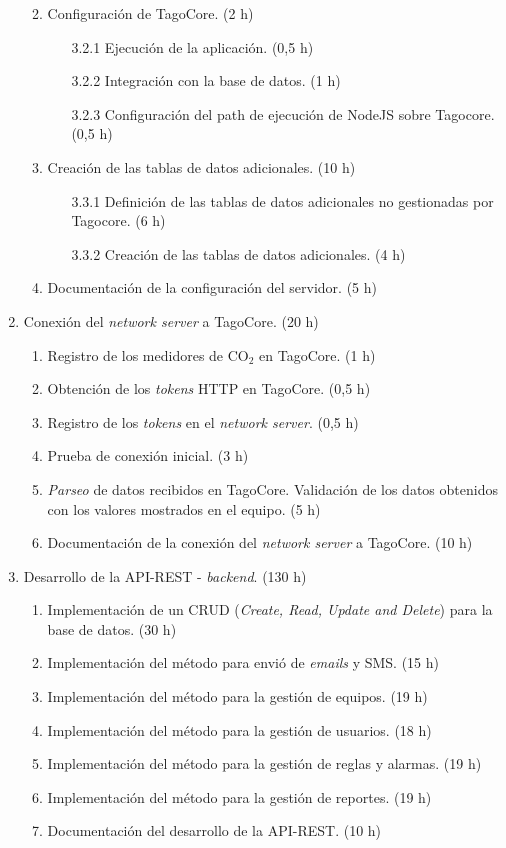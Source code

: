 \documentclass[
11pt, %
]{charter}
\begin{document}
\begin{enumerate}
\begin{enumerate}
\begin{enumerate}
		\end{enumerate}
	\item  Configuración de TagoCore. (2 h)
		\begin{enumerate}
		\item[3.2.1]Ejecución de la aplicación. 	(0,5 h)
		\item[3.2.2]Integración con la base de datos. (1 h)
		\item[3.2.3]Configuración del path de ejecución de NodeJS sobre Tagocore. (0,5 h)
		\end{enumerate}
	\item Creación de las tablas de datos adicionales. (10 h)
		\begin{enumerate}
		\item[3.3.1]Definición de las tablas de datos adicionales no gestionadas por Tagocore. 	(6 h)
		\item[3.3.2]Creación de las tablas de datos adicionales. (4 h)
		\end{enumerate}
	\item Documentación de la configuración del servidor. (5 h)
	\end{enumerate}
\item Conexión del \textit{network server} a TagoCore. (20 h)
	\begin{enumerate}
	\item Registro de los medidores de CO$_{2}$ en TagoCore. (1 h)
	\item Obtención de los \textit{tokens} HTTP en TagoCore. (0,5 h)
	\item Registro de los \textit{tokens} en el \textit{network server}. (0,5 h)
	\item Prueba de conexión inicial. (3 h)
	\item \textit{Parseo} de datos recibidos en TagoCore. Validación de los datos obtenidos con los valores mostrados en el equipo. (5 h)
	\item Documentación de la conexión del \textit{network server} a TagoCore. (10 h)
	\end{enumerate}
\item Desarrollo de la API-REST - \textit{backend}.   (130 h)
	\begin{enumerate}
	\item Implementación de un CRUD (\textit{Create, Read, Update and Delete}) para la base de datos.	(30 h)	
	\item Implementación del método para envió de \textit{emails} y SMS. (15 h)
	\item Implementación del método para la gestión de equipos. (19 h)
	\item Implementación del método para la gestión de usuarios. (18 h)
	\item Implementación del método para la gestión de reglas y alarmas. (19 h)
	\item Implementación del método para la gestión de reportes. (19 h)
	\item Documentación del desarrollo de la API-REST. (10 h)
	\end{enumerate}


\end{enumerate}
\end{document}
